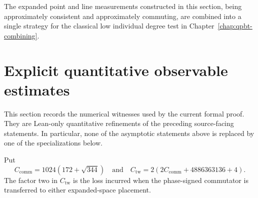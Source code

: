 The expanded point and line measurements constructed in this section, being
approximately consistent and approximately commuting, are combined into a
single strategy for the classical low individual degree test in
Chapter~\ref{chap:qpbt-combining}.

\section{Explicit quantitative observable estimates}
\label{sec:qld-observables-explicit}

This section records the numerical witnesses used by the current formal proof.
They are Lean-only quantitative refinements of the preceding source-facing
statements.  In particular, none of the asymptotic statements above is replaced
by one of the specializations below.

\begin{definition}
\label{def:pauli-observable-baseline-constants}
\leanok
{}
Put
\[
 C_{\mathrm{comm}}=1024(172+\sqrt{344})
 \quad\text{and}\quad
 C_{\mathrm{tw}}=2(2C_{\mathrm{comm}}+4886363136+4).
\]
The factor two in $C_{\mathrm{tw}}$ is the loss incurred when the
phase-signed commutator is transferred to either expanded-space placement.
\end{definition}


